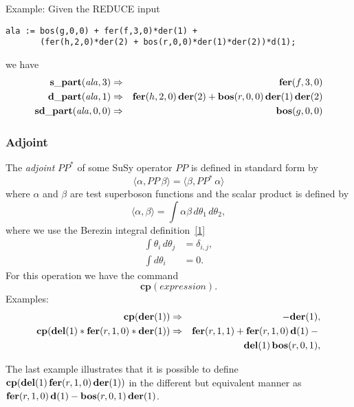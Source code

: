 {Example: Given the REDUCE input
\begin{verbatim}
ala := bos(g,0,0) + fer(f,3,0)*der(1) +
       (fer(h,2,0)*der(2) + bos(r,0,0)*der(1)*der(2))*d(1);
\end{verbatim}
we have
\begin{eqnarray*}
  \mathbf{s\_part}(\mathit{ala},3) &\Rightarrow& \mathbf{fer}(f,3,0) \\
  \mathbf{d\_part}(\mathit{ala},1) &\Rightarrow& \mathbf{fer}(h,2,0)\,\mathbf{der}(2) +
  \mathbf{bos}(r,0,0)\,\mathbf{der}(1)\,\mathbf{der}(2) \\
  \mathbf{sd\_part}(\mathit{ala},0,0) &\Rightarrow& \mathbf{bos}(g,0,0)
\end{eqnarray*}

\subsubsection*{Adjoint}

The \emph{adjoint} $\mathit{PP}^*$ of some SuSy operator $\mathit{PP}$
is defined in standard form by
\begin{equation*}
  \langle \alpha, \mathit{PP}\,\beta \rangle =
  \langle \beta, \mathit{PP}^*\,\alpha \rangle
\end{equation*}
where $\alpha$ and $\beta$ are test superboson functions and the
scalar product is defined by
\begin{equation*}
  \langle \alpha, \beta \rangle =
  \int \alpha \beta\,d\theta_{1}\,d\theta_{2},
\end{equation*}
where we use the Berezin integral definition~\hyperlink{susy2-bib}{[1]}
\begin{align*}
  \int \theta_{i}\,d\theta_{j} &= \delta_{i,j}, \\
  \int d\theta_{i} &= 0.
\end{align*}
For this operation we have the command
\begin{equation*}
  \mathbf{cp}(\mathit{expression}).
\end{equation*}
Examples:
\begin{eqnarray*}
  \mathbf{cp}(\mathbf{der}(1)) &\Rightarrow& -\mathbf{der}(1), \\
  \mathbf{cp}(\mathbf{del}(1)*\mathbf{fer}(r,1,0)*\mathbf{der}(1)) &\Rightarrow&
  \mathbf{fer}(r,1,1) + \mathbf{fer}(r,1,0)\,\mathbf{d}(1) - \mbox{}\\
  && \mathbf{del}(1)\,\mathbf{bos}(r,0,1),
\end{eqnarray*}

The last example illustrates that it is possible to define
$\mathbf{cp}(\mathbf{del}(1)\,\mathbf{fer}(r,1,0)\,\mathbf{der}(1))$ in the different but
equivalent manner as $\mathbf{fer}(r,1,0)\,\mathbf{d}(1) - \mathbf{bos}(r,0,1)\,\mathbf{der}(1)$.

}
